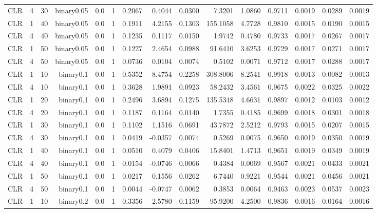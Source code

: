 \begin{longtable}{rrrrrrrrrrrrrrr}
  CLR & 4 & 30 & binary0.05 & 0.0 & 1 & 0.2067 & 0.4044 & 0.0300 & 7.3201 & 1.0860 & 0.9711 & 0.0019 & 0.0289 & 0.0019 \\ 
  CLR & 1 & 40 & binary0.05 & 0.0 & 1 & 0.1911 & 4.2155 & 0.1303 & 155.1058 & 4.7728 & 0.9810 & 0.0015 & 0.0190 & 0.0015 \\ 
  CLR & 4 & 40 & binary0.05 & 0.0 & 1 & 0.1235 & 0.1117 & 0.0150 & 1.9742 & 0.4780 & 0.9733 & 0.0017 & 0.0267 & 0.0017 \\ 
  CLR & 1 & 50 & binary0.05 & 0.0 & 1 & 0.1227 & 2.4654 & 0.0988 & 91.6410 & 3.6253 & 0.9729 & 0.0017 & 0.0271 & 0.0017 \\ 
  CLR & 4 & 50 & binary0.05 & 0.0 & 1 & 0.0736 & 0.0104 & 0.0074 & 0.5102 & 0.0071 & 0.9712 & 0.0017 & 0.0288 & 0.0017 \\ 
  CLR & 1 & 10 & binary0.1 & 0.0 & 1 & 0.5352 & 8.4754 & 0.2258 & 308.8006 & 8.2541 & 0.9918 & 0.0013 & 0.0082 & 0.0013 \\ 
  CLR & 4 & 10 & binary0.1 & 0.0 & 1 & 0.3628 & 1.9891 & 0.0923 & 58.2432 & 3.4561 & 0.9675 & 0.0022 & 0.0325 & 0.0022 \\ 
  CLR & 1 & 20 & binary0.1 & 0.0 & 1 & 0.2496 & 3.6894 & 0.1275 & 135.5348 & 4.6631 & 0.9897 & 0.0012 & 0.0103 & 0.0012 \\ 
  CLR & 4 & 20 & binary0.1 & 0.0 & 1 & 0.1187 & 0.1164 & 0.0140 & 1.7355 & 0.4185 & 0.9699 & 0.0018 & 0.0301 & 0.0018 \\ 
  CLR & 1 & 30 & binary0.1 & 0.0 & 1 & 0.1102 & 1.1516 & 0.0691 & 43.7872 & 2.5212 & 0.9793 & 0.0015 & 0.0207 & 0.0015 \\ 
  CLR & 4 & 30 & binary0.1 & 0.0 & 1 & 0.0419 & -0.0357 & 0.0074 & 0.5269 & 0.0075 & 0.9650 & 0.0019 & 0.0350 & 0.0019 \\ 
  CLR & 1 & 40 & binary0.1 & 0.0 & 1 & 0.0510 & 0.4079 & 0.0406 & 15.8401 & 1.4713 & 0.9651 & 0.0019 & 0.0349 & 0.0019 \\ 
  CLR & 4 & 40 & binary0.1 & 0.0 & 1 & 0.0154 & -0.0746 & 0.0066 & 0.4384 & 0.0069 & 0.9567 & 0.0021 & 0.0433 & 0.0021 \\ 
  CLR & 1 & 50 & binary0.1 & 0.0 & 1 & 0.0217 & 0.1556 & 0.0262 & 6.7440 & 0.9221 & 0.9544 & 0.0021 & 0.0456 & 0.0021 \\ 
  CLR & 4 & 50 & binary0.1 & 0.0 & 1 & 0.0044 & -0.0747 & 0.0062 & 0.3853 & 0.0064 & 0.9463 & 0.0023 & 0.0537 & 0.0023 \\ 
  CLR & 1 & 10 & binary0.2 & 0.0 & 1 & 0.3356 & 2.5780 & 0.1159 & 95.9200 & 4.2500 & 0.9836 & 0.0016 & 0.0164 & 0.0016 \\ 

\end{longtable}

